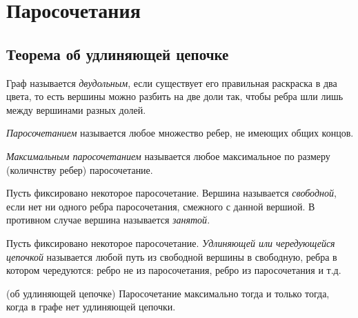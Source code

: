 \chapter{ Паросочетания }
\section{Теорема об удлиняющей цепочке}
\begin{Def}
Граф называется \textit{двудольным}, если существует его правильная раскраска в два цвета, то
есть вершины можно разбить на две доли так, чтобы ребра шли лишь между вершинами разных долей.
\end{Def}

\begin{Def}
\textit{Паросочетанием} называется любое множество ребер, не имеющих общих концов.
\end{Def}

\begin{Def}
\textit{Максимальным паросочетанием} называется любое максимальное по размеру (количнству ребер) паросочетание.
\end{Def}

\begin{Def}
Пусть фиксировано некоторое паросочетание. Вершина называется \textit{свободной}, если нет ни одного ребра паросочетания,
смежного с данной вершиой. В противном случае вершина называется \textit{занятой}.
\end{Def}

\begin{Def}
Пусть фиксировано некоторое паросочетание. \textit{Удлиняющей или чередующейся цепочкой} называется 
любой путь из свободной вершины в свободную,
ребра в котором чередуются: ребро не из паросочетания, ребро из паросочетания и т.д.
\end{Def}

\begin{theorem}{(об удлиняющей цепочке)}
Паросочетание максимально тогда и только тогда, когда в графе нет удлиняющей цепочки.
\end{theorem}

